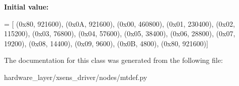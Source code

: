 {\bfseries Initial value\+:}
\begin{DoxyCode}
=  [
        (0x80, 921600),
        (0x0A, 921600),
        (0x00, 460800),
        (0x01, 230400),
        (0x02, 115200),
        (0x03,  76800),
        (0x04,  57600),
        (0x05,  38400),
        (0x06,  28800),
        (0x07,  19200),
        (0x08,  14400),
        (0x09,   9600),
        (0x0B,   4800),
        (0x80, 921600)]
\end{DoxyCode}


The documentation for this class was generated from the following file\+:\begin{DoxyCompactItemize}
\item 
hardware\+\_\+layer/xsens\+\_\+driver/nodes/mtdef.\+py\end{DoxyCompactItemize}
